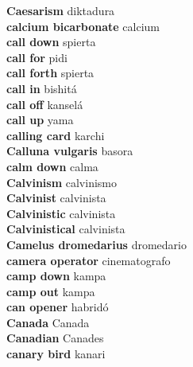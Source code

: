 \textbf{ Caesarism  } diktadura \\
\textbf{ calcium bicarbonate  } calcium \\
\textbf{ call down  } spierta \\
\textbf{ call for  } pidi \\
\textbf{ call forth  } spierta \\
\textbf{ call in  } bishitá \\
\textbf{ call off  } kanselá \\
\textbf{ call up  } yama \\
\textbf{ calling card  } karchi \\
\textbf{ Calluna vulgaris  } basora \\
\textbf{ calm down  } calma \\
\textbf{ Calvinism  } calvinismo \\
\textbf{ Calvinist  } calvinista \\
\textbf{ Calvinistic  } calvinista \\
\textbf{ Calvinistical  } calvinista \\
\textbf{ Camelus dromedarius  } dromedario \\
\textbf{ camera operator  } cinematografo \\
\textbf{ camp down  } kampa \\
\textbf{ camp out  } kampa \\
\textbf{ can opener  } habridó \\
\textbf{ Canada  } Canada \\
\textbf{ Canadian  } Canades \\
\textbf{ canary bird  } kanari \\
